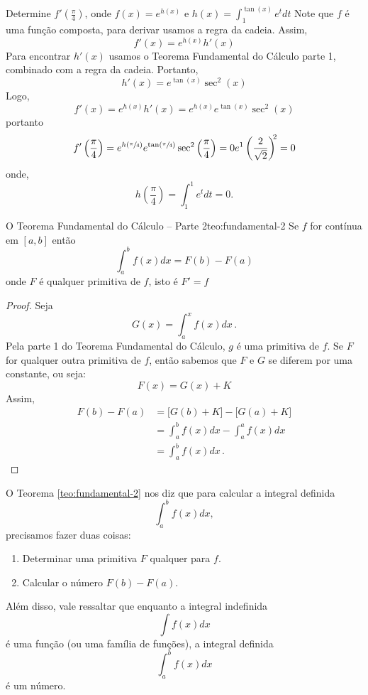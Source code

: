 \begin{example}
  Determine
  \(f'\left(\frac{\pi}{4}\right)\), onde
  \(f(x)= e^{h(x)}\) e
  \(h(x)= \int^{\tan(x)}_1 e^t dt\)
  \solution
  Note que $f$ é uma função composta, para derivar usamos a regra da cadeia.
  Assim,
  \[
    f'(x)= e^{h(x)}h'(x)
  \]
  Para encontrar $h'(x)$ usamos o Teorema Fundamental do Cálculo parte 1,
  combinado com a regra da cadeia. Portanto,
  \[
    h'(x)=e^{\tan(x)}\sec^2(x)
  \]
  Logo,
  \[
    f'(x)
    = e^{h(x)}h'(x)
    =e^{h(x)}e^{\tan(x)}\sec^2(x)
  \]
  portanto
  \[
    f'\left(\frac{\pi}{4}\right)
    = e^{h(\sfrac{\pi}{4})}
      e^{\tan(\sfrac{\pi}{4})}
      \sec^2\left(\frac{\pi}{4}\right)
    = 0 e^1 \left(\frac{2}{\sqrt{2}}\right)^{\!\!2}=0
  \]
  onde,
  \[
    h\left(\frac{\pi}{4} \right)
    = \int_1^1 e^t dt
    = 0.
  \]
\end{example}

\begin{teorema}{O Teorema Fundamental do Cálculo -- Parte 2}{teo:fundamental-2}
  Se $f$ for contínua em $[a, b]$ então
  \[
    \int_a^{b}f(x)dx= F(b)-F(a)
  \]
  onde $F$ é qualquer primitiva de $f$, isto é $F'=f$
\end{teorema}

\begin{proof}
  Seja
  \[
    G(x)= \int_a^x f(x)dx \,.
  \]
  Pela parte 1 do Teorema Fundamental do Cálculo,
  $g$ é uma primitiva de $f$. Se $F$ for qualquer outra primitiva de $f$,
  então sabemos que $F$ e $G$ se diferem por uma constante, ou seja:
  \[
      F(x)= G(x)+K
  \]
  Assim,
  \begin{align*}
    F(b)-F(a)
      & = \big[ G(b) + K \big]
        - \big[ G(a) + K \big] \\
      & = \int_a^b f(x)dx -  \int_a^a f(x)dx \\
      & = \int_a^b f(x)dx \,.
  \end{align*}
\end{proof}

O Teorema \ref{teo:fundamental-2} nos diz que para calcular a integral
definida
\[\int_a^b f(x)dx,\]
precisamos fazer duas coisas:
\begin{enumerate}
    \item Determinar uma primitiva $F$ qualquer para $f$.
    \item Calcular o número $F(b)-F(a)$.
\end{enumerate}
Além disso, vale ressaltar que enquanto a integral indefinida
\[\int f(x)dx\]
é uma função (ou uma família de funções),
a integral definida
\[\int_a^b f(x)dx\]
é um número.

